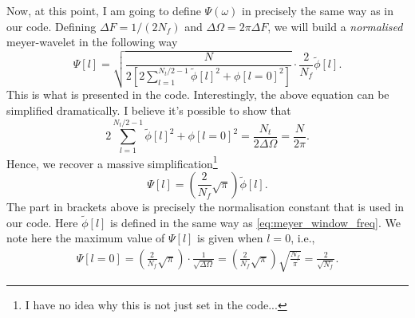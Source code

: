 \documentclass{article}
\begin{document}
Now, at this point, I am going to define $\Psi(\omega)$ in precisely the same way as in our code. Defining $\Delta F = 1/(2N_{f})$ and $\Delta \Omega = 2\pi \Delta F$, we will build a \emph{normalised} meyer-wavelet in the following way
\begin{equation}
\Psi[l] = \sqrt{\frac{N}{2\left[2\sum_{l = 1}^{N_{t}/2 - 1}\tilde{\phi}[l]^2 + \phi[l= 0]^2\right]}} \cdot \frac{2}{N_{f}} \tilde{\phi}[l].
\end{equation}
This is what is presented in the code. Interestingly, the above equation can be simplified dramatically. I believe it's possible to show that
\begin{equation}
2\sum_{l = 1}^{N_{t}/2 - 1}\tilde{\phi}[l]^2 + \phi[l= 0]^2 = \frac{N_{t}}{2\Delta\Omega} = \frac{N}{2\pi}.
\end{equation}
Hence, we recover a massive simplification\footnote{I have no idea why this is not just set in the code...}
\begin{equation}\label{eq:normalised_meyer_wavelet}
\Psi[l] = \left(\frac{2}{N_{f}}\sqrt{\pi}\right)\tilde{\phi}[l].
\end{equation}
The part in brackets above is precisely the normalisation constant that is used in our code. Here $\tilde{\phi}[l]$ is defined in the same way as \eqref{eq:meyer_window_freq}. We note here the maximum value of $\Psi[l]$ is given when $l = 0$, i.e.,
\begin{align}\label{eq:psi_l=0_normed}
   \Psi[l = 0] = \left(\frac{2}{N_{f}}\sqrt{\pi}\right) \cdot \frac{1}{\sqrt{\Delta\Omega}} = \left(\frac{2}{N_{f}}\sqrt{\pi}\right) \sqrt{\frac{N_{f}}{\pi}} = \frac{2}{\sqrt{N_{f}}}.
\end{align}
\end{document}
